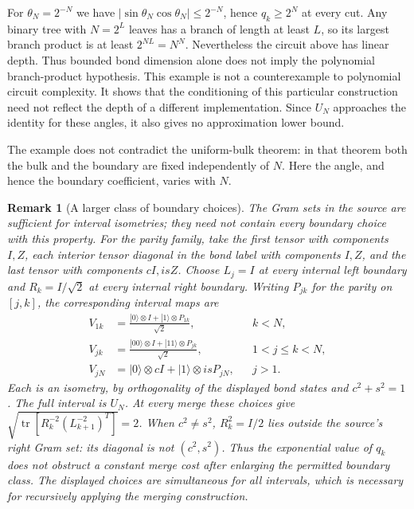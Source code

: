 \documentclass[11pt]{article}
\newtheorem{remark}[theorem]{Remark}
\begin{document}
For $\theta_N=2^{-N}$ we have
$|\sin\theta_N\cos\theta_N|\leq2^{-N}$, hence $q_k\geq2^N$ at every cut.
Any binary tree with $N=2^L$ leaves has a branch of length at least $L$,
so its largest branch product is at least $2^{NL}=N^N$.
Nevertheless the circuit above has linear depth. Thus bounded bond
dimension alone does not imply the polynomial branch-product hypothesis.
This example is not a counterexample to polynomial circuit complexity.
It shows that the conditioning of this particular construction need not
reflect the depth of a different implementation. Since $U_N$ approaches
the identity for these angles, it also gives no approximation lower bound.

The example does not contradict the uniform-bulk theorem: in that theorem
both the bulk and the boundary are fixed independently of $N$. Here the
angle, and hence the boundary coefficient, varies with $N$.

\begin{remark}[A larger class of boundary choices]
The Gram sets in the source are sufficient for interval isometries; they
need not contain every boundary choice with this property. For the parity
family, take the first tensor with components $I,Z$, each interior tensor
diagonal in the bond label with components $I,Z$, and the last tensor with
components $cI,isZ$. Choose $L_j=I$ at every internal left boundary and
$R_k=I/\sqrt2$ at every internal right boundary. Writing $P_{jk}$ for the
parity on $[j,k]$, the corresponding interval maps are
\begin{align}
 V_{1k}&=\frac{|0\rangle\otimes I+|1\rangle\otimes P_{1k}}{\sqrt2},
       &&k<N,\\
 V_{jk}&=\frac{|00\rangle\otimes I+|11\rangle\otimes P_{jk}}{\sqrt2},
       &&1<j\leq k<N,\\
 V_{jN}&=|0\rangle\otimes cI+|1\rangle\otimes isP_{jN},
       &&j>1.
\end{align}
Each is an isometry, by orthogonality of the displayed bond states and
$c^2+s^2=1$. The full interval is $U_N$. At every merge these choices give
$\sqrt{\operatorname{tr}[R_k^{-2}(L_{k+1}^{-2})^T]}=2$.
When $c^2\ne s^2$, $R_k^2=I/2$ lies outside the source's right Gram set:
its diagonal is not $(c^2,s^2)$. Thus the exponential value of $q_k$ does
not obstruct a constant merge cost after enlarging the permitted boundary
class. The displayed choices are simultaneous for all intervals, which is
necessary for recursively applying the merging construction.
\end{remark}
\end{document}
